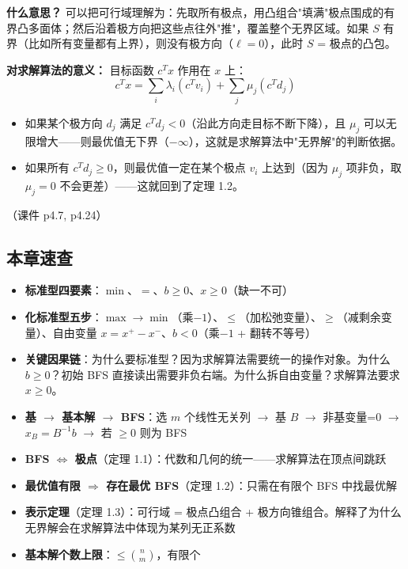 \textbf{什么意思？} 可以把可行域理解为：先取所有极点，用凸组合"填满"极点围成的有界凸多面体；然后沿着极方向把这些点往外"推"，覆盖整个无界区域。如果 $S$ 有界（比如所有变量都有上界），则没有极方向（$\ell=0$），此时 $S$ = 极点的凸包。

\textbf{对求解算法的意义：} 目标函数 $c^Tx$ 作用在 $x$ 上：
\[
c^Tx = \sum_i \lambda_i (c^T v_i) + \sum_j \mu_j (c^T d_j)
\]
\begin{itemize}
  \item 如果某个极方向 $d_j$ 满足 $c^T d_j < 0$（沿此方向走目标不断下降），且 $\mu_j$ 可以无限增大——则最优值无下界（$-\infty$），这就是求解算法中"无界解"的判断依据。
  \item 如果所有 $c^T d_j \ge 0$，则最优值一定在某个极点 $v_i$ 上达到（因为 $\mu_j$ 项非负，取 $\mu_j=0$ 不会更差）——这就回到了定理 1.2。
\end{itemize}

（课件 p4.7, p4.24）

\subsection{本章速查}

\begin{itemize}
  \item \textbf{标准型四要素}：$\min$、$=$、$b\ge 0$、$x\ge 0$（缺一不可）
  \item \textbf{化标准型五步}：$\max\to\min$（乘$-1$）、$\le$（加松弛变量）、$\ge$（减剩余变量）、自由变量 $x=x^+-x^-$、$b<0$（乘$-1$ + 翻转不等号）
  \item \textbf{关键因果链}：为什么要标准型？因为求解算法需要统一的操作对象。为什么 $b\ge 0$？初始 BFS 直接读出需要非负右端。为什么拆自由变量？求解算法要求 $x\ge 0$。
  \item \textbf{基 $\to$ 基本解 $\to$ BFS}：选 $m$ 个线性无关列 $\to$ 基 $B$ $\to$ 非基变量=0 $\to$ $x_B=B^{-1}b$ $\to$ 若 $\ge 0$ 则为 BFS
  \item \textbf{BFS $\Leftrightarrow$ 极点}（定理 1.1）：代数和几何的统一——求解算法在顶点间跳跃
  \item \textbf{最优值有限 $\Rightarrow$ 存在最优 BFS}（定理 1.2）：只需在有限个 BFS 中找最优解
  \item \textbf{表示定理}（定理 1.3）：可行域 = 极点凸组合 + 极方向锥组合。解释了为什么无界解会在求解算法中体现为某列无正系数
  \item \textbf{基本解个数上限}：$\le \binom{n}{m}$，有限个
\end{itemize}
